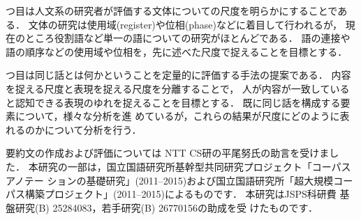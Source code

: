 \documentclass[japanese]{jnlp_1.4}
\newcommand{\modified}[1]{}
\begin{document}
\modified{
二つ目は情報構造アノテーションとの重ね合わせである．尺度において，語順の評価を入
れるかどうかが一つの論点であった．日本語において語順を決める一つの要素として情
報構造がある．情報構造は言語生産者側の観点である情報状態 \{speaker-new,
speaker-old\}と言語受容者側の観点である共有性 \{hearer-new, hearer-old\}の区別
を行い，後者については被験者実験的にアノテーションを行う．これらのアノテーション
結果を用いて，なぜ要約文はその順序で情報を提示する必要があるのかについて検討する．}

\modified{三つ目は要約文の言語受容者側の観点からの認知的な評価である．
今回は元文書の言語受容者であり要約文の言語生産者側の観点からの認知的な評価を主に
扱った．生産された要約文が他の言語受容者にとって同じ話として認定されるか
\cite{kato-jnlp-2016,kato-jcss-2015}を検討していきたい．
一方，日本語複数文書要約についての拡張も考えられるが，元文書側の言語生産者が複数
人になるという問題がある．複数の言語生産者側が考慮している情報構造が，要約作成者
と要約受容者にどのように受容されるか追跡可能な認知実験手法を検討する．
}

\modified{四}つ目は人文系の研究者が評価する文体についての尺度を明らかにすることである．
文体の研究は使用域(register)や位相(phase)などに着目して行われるが，
現在のところ役割語など単一の語についての研究がほとんどである．
語の連接や語の順序などの使用域や位相を，先に述べた尺度で捉えることを目標とする．

\modified{五}つ目は同じ話とは何かということを定量的に評価する手法の提案である．
内容を捉える尺度と表現を捉える尺度を分離することで，
人が内容が一致していると認知できる表現のゆれを捉えることを目標とする．
既に同じ話を構成する要素について，様々な分析\cite{yasuda-2012-JCSS,yasuda-2013-JASS32,yasuda-2014-JASS33,kato-jass-2015,kato-jass-2016}を進
めているが，これらの結果が尺度にどのように表れるのかについて分析を行う．


\acknowledgment

要約文の作成および評価については NTT CS研の平尾努氏の助言を受けました．
本研究の一部は，国立国語研究所基幹型共同研究プロジェクト「コーパスアノテー
ションの基礎研究」(2011--2015)および国立国語研究所「超大規模コーパス構築プロジェクト」(2011--2015)によるものです．
本研究はJSPS科研費 基盤研究(B) 25284083，若手研究(B) 26770156の助成を受
けたものです．
\end{document}
